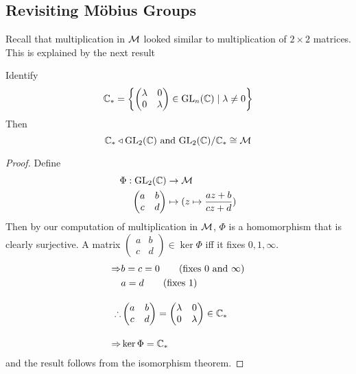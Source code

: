 \documentclass{article}
\begin{document}
\subsection{Revisiting M\"obius Groups}
Recall that multiplication in $\mathcal{M}$ looked similar to multiplication of $2 \times 2$ matrices.
This is explained by the next result
\begin{prop}
    Identify
    \[
        \mathbb{C}_\ast = \left\{ 
            \begin{pmatrix}
                \lambda & 0\\
                0 & \lambda
            \end{pmatrix} 
            \in \mathrm{GL}_n(\mathbb{C}) \mid \lambda \neq 0
         \right\}
    \]
    Then
    \[
        \mathbb{C}_\ast \triangleleft \mathrm{GL}_2(\mathbb{C}) \text{ and } \mathrm{GL}_2(\mathbb{C}) / \mathbb{C}_\ast \cong \mathcal{M}
    \]
\end{prop}
\begin{proof}
    Define
    \begin{align*}
        \Phi: \mathrm{GL}_2(\mathbb{C}) &\rightarrow \mathcal{M} \\
        \begin{pmatrix}
            a & b \\
            c & d
        \end{pmatrix}
        &\mapsto (z \mapsto \frac{az + b}{cz + d})
    \end{align*}
    Then by our computation of multiplication in $\mathcal{M}$, $\Phi$ is a homomorphism that is clearly surjective.
    A matrix $\begin{pmatrix}
        a & b \\
        c & d
    \end{pmatrix} \in \ker \Phi$ iff it fixes $0, 1, \infty$.
    \begin{align*}
        \Rightarrow & b = c = 0 \tag{fixes $0$ and $\infty$} \\
        & a = d \tag{fixes $1$} \\[10pt]
        \therefore & \begin{pmatrix}
            a & b \\
            c & d
        \end{pmatrix} = \begin{pmatrix}
            \lambda & 0 \\
            0 & \lambda
        \end{pmatrix} \in \mathbb{C}_\ast \\[10pt]
        \Rightarrow & \ker \Phi = \mathbb{C}_\ast
    \end{align*}
    and the result follows from the isomorphism theorem.
\end{proof}
\end{document}
